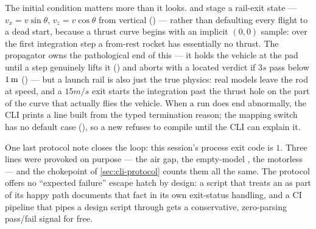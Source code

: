 The initial condition matters more than it looks.  and  stage a
rail-exit state --- $v_x = v\sin\theta$, $v_z = v\cos\theta$ from vertical
() --- rather than defaulting every flight to a dead start, because a thrust
curve begins with an implicit $(0,0)$ sample: over the first integration step a from-rest rocket
has essentially no thrust. The propagator owns the pathological end of this --- it holds the
vehicle at the pad until a step genuinely lifts it () and aborts
with a located  verdict if $3\unit{s}$ pass below $1\,\mathrm{m}$
() --- but a launch rail is also just the true physics: real models
leave the rod at speed, and a $15\unit{m/s}$ exit starts the integration past the thrust hole on
the part of the curve that actually flies the vehicle. When a run does end abnormally, the CLI
prints a  line built from the typed termination reason; the mapping switch has no
default case (), so a new  refuses to compile until
the CLI can explain it.

One last protocol note closes the loop: this session's process exit code is $1$. Three 
lines were provoked on purpose --- the air gap, the empty-model , the motorless
 --- and the chokepoint of \cref{sec:cli-protocol} counts them all the same. The
protocol offers no ``expected failure'' escape hatch by design: a script that treats an
 as part of its happy path documents that fact in its own exit-status handling, and a
CI pipeline that pipes a design script through  gets a conservative,
zero-parsing pass/fail signal for free.
